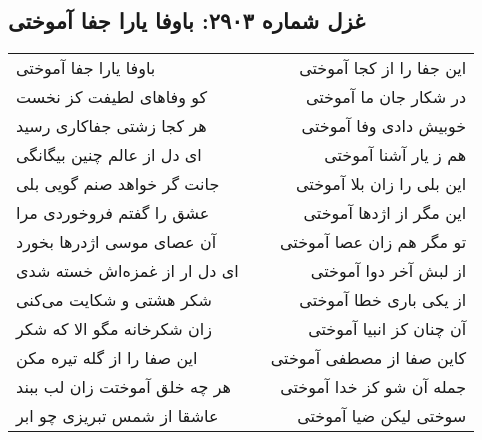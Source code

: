 \begin{center}
\section*{غزل شماره ۲۹۰۳: باوفا یارا جفا آموختی}
\label{sec:2903}
\begin{longtable}{l p{0.5cm} r}
باوفا یارا جفا آموختی
&&
این جفا را از کجا آموختی
\\
کو وفاهای لطیفت کز نخست
&&
در شکار جان ما آموختی
\\
هر کجا زشتی جفاکاری رسید
&&
خوبیش دادی وفا آموختی
\\
ای دل از عالم چنین بیگانگی
&&
هم ز یار آشنا آموختی
\\
جانت گر خواهد صنم گویی بلی
&&
این بلی را زان بلا آموختی
\\
عشق را گفتم فروخوردی مرا
&&
این مگر از اژدها آموختی
\\
آن عصای موسی اژدرها بخورد
&&
تو مگر هم زان عصا آموختی
\\
ای دل ار از غمزه‌اش خسته شدی
&&
از لبش آخر دوا آموختی
\\
شکر هشتی و شکایت می‌کنی
&&
از یکی باری خطا آموختی
\\
زان شکرخانه مگو الا که شکر
&&
آن چنان کز انبیا آموختی
\\
این صفا را از گله تیره مکن
&&
کاین صفا از مصطفی آموختی
\\
هر چه خلق آموختت زان لب ببند
&&
جمله آن شو کز خدا آموختی
\\
عاشقا از شمس تبریزی چو ابر
&&
سوختی لیکن ضیا آموختی
\\
\end{longtable}
\end{center}
